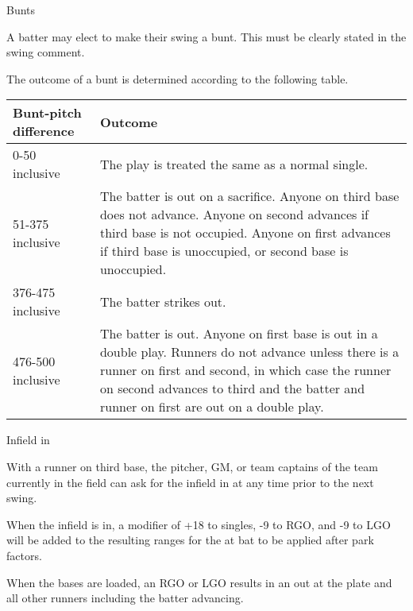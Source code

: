 \begin{deepEnumerate}
\begin{deepEnumerate}
\begin{center}
		\end{center}
	\end{deepEnumerate}
	\item Bunts
	\begin{deepEnumerate}
		\item A batter may elect to make their swing a bunt. This must be clearly stated in the swing comment.
		\item The outcome of a bunt is determined according to the following table.        
		\begin{center}
			\begin{tabular}{|p{3cm}|p{8cm}|}
				\hline
				\textbf{Bunt-pitch difference} & \textbf{Outcome}                                 \\
				\hline 
				0-50 inclusive                 & The play is treated the same as a normal single. \\
				\hline 
				51-375 inclusive               & The batter is out on a sacrifice.                
				Anyone on third base does not advance.
				Anyone on second advances if third base is not occupied.
				Anyone on first advances if third base is unoccupied, or second base is unoccupied. \\
				\hline 
				376-475 inclusive              & The batter strikes out.                          \\
				\hline
				476-500 inclusive              & The batter is out.                               
				Anyone on first base is out in a double play.
				Runners do not advance unless there is a runner on first and second, in which
				case the runner on second advances to third and the batter and runner on first are out on a double play. \\
				\hline
			\end{tabular}
		\end{center}
    \end{deepEnumerate}
    \item Infield in
    \begin{deepEnumerate}
        \item With a runner on third base, the pitcher, GM, or team captains of the team currently in the field 
        can ask for the infield in at any time prior to the next swing.
        \item When the infield is in, a modifier of +18 to singles, -9 to RGO, and -9 to LGO 
        will be added to the resulting ranges for the at bat to be applied after park factors.
        \item When the bases are loaded, an RGO or LGO results in an out at the plate and all other runners including the batter advancing.

\end{deepEnumerate}
\end{deepEnumerate}
